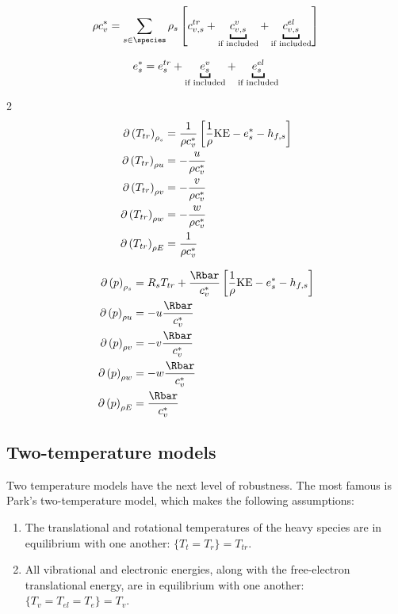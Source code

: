 \documentclass[10pt]{article}
\begin{document}
\begin{flushleft}
\begin{equation*}
    \rho c_v^* = \sum_{s \in \species} \rho_s \bb{c_{v,s}^{tr} + \ub{c_{v,s}^v}{\text{if included}} + \ub{c_{v,s}^{el}}{\text{if included}}}
\end{equation*}

\begin{equation*}
    e_s^* = e_{s}^{tr} + \ub{e_{s}^v}{\text{if included}} + \ub{e_{s}^{el}}{\text{if included}}
\end{equation*}

\begin{multicols}{2}    
    \begin{align*}
        \partial \left( T_{tr} \right)_{\rho_s} &= \frac{1}{\rho c_v^{*}} \left[ \frac{1}{\rho} \text{KE} - e_s^* - h_{f,s} \right]
        \\ \partial \left( T_{tr} \right)_{\rho u} &= - \frac{u}{\rho c_v^{*}}
        \\ \partial \left( T_{tr} \right)_{\rho v} &= - \frac{v}{\rho c_v^{*}}
        \\ \partial \left( T_{tr} \right)_{\rho w} &= - \frac{w}{\rho c_v^{*}}
        \\ \partial \left( T_{tr} \right)_{\rho E} &= \frac{1}{\rho c_v^{*}}
    \end{align*}        

    \begin{align*}
        \partial \bp{p}_{\rho_s} &= R_s T_{tr} + \frac{\Rbar}{c_v^{*}} \bb{\frac{1}{\rho} \text{KE} - e_s^* - h_{f,s}}
        \\ \partial \bp{p}_{\rho u} &= -u \frac{\Rbar}{c_v^{*}}
        \\ \partial \bp{p}_{\rho v} &= -v \frac{\Rbar}{c_v^{*}}
        \\ \partial \bp{p}_{\rho w} &= -w \frac{\Rbar}{c_v^{*}}
        \\ \partial \bp{p}_{\rho E} &= \frac{\Rbar}{c_v^{*}}
    \end{align*}    
\end{multicols}


\subsection{Two-temperature models}

Two temperature models have the next level of robustness. The most famous is Park's two-temperature model, which makes the following assumptions:

\begin{enumerate}
    \item The translational and rotational temperatures of the heavy species are in equilibrium with one another: $\{T_t = T_r\} = T_{tr}$.
    \item All vibrational and electronic energies, along with the free-electron translational energy, are in equilibrium with one another: $\{T_{v} = T_{el} = T_e\} = T_{v}$.
\end{enumerate}


\end{flushleft}
\end{document}
